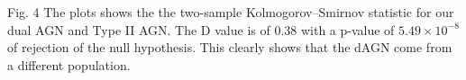 Fig. 4
  The plots shows the the two-sample Kolmogorov–Smirnov statistic for our dual AGN and Type II AGN. The D value is of 0.38 with a p-value of $5.49\times10^{-8}$ of rejection of the null hypothesis. This clearly shows that the dAGN come from a different population. 